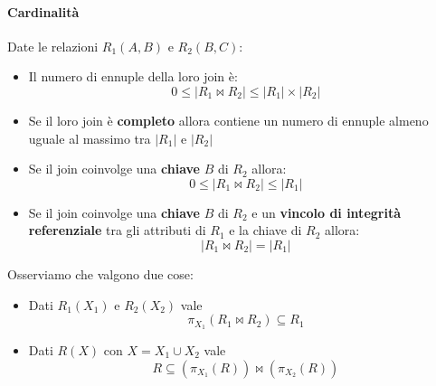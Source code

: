 \paragraph{Cardinalità} Date le relazioni $R_1(A,B)$ e $R_2(B, C)$:
\begin{itemize}
	\item Il numero di ennuple della loro join è:
	\begin{equation*}
		0 \leq \lvert R_1 \Join R_2 \rvert \leq \lvert R_1 \rvert \times \lvert R_2 \rvert
	\end{equation*}
	\item Se il loro join è \textbf{completo} allora contiene un numero di ennuple almeno uguale al massimo tra $\lvert R_1 \rvert$ e $\lvert R_2 \rvert$
	\item Se il join coinvolge una \textbf{chiave} $B$ di $R_2$ allora:
	\begin{equation*}
		0 \leq \lvert R_1 \Join R_2 \rvert \leq \lvert R_1 \rvert 
	\end{equation*}
	\item Se il join coinvolge una \textbf{chiave} $B$ di $R_2$ e un \textbf{vincolo di integrità referenziale} tra gli attributi di $R_1$ e la chiave di $R_2$ allora:
	\begin{equation*}
		\lvert R_1 \Join R_2 \rvert = \lvert R_1 \rvert
	\end{equation*}
\end{itemize}

\begin{observation}
	Osserviamo che valgono due cose:
	\begin{itemize}
		\item Dati $R_1(X_1)$ e $R_2(X_2)$ vale
		\begin{equation}
			\pi_{X_1}(R_1 \Join R_2) \subseteq R_1
		\end{equation}
		\item Dati $R(X)$ con $X = X_1 \cup X_2$ vale
		\begin{equation}
			R \subseteq (\pi_{X_1}(R)) \Join (\pi_{X_2}(R))
		\end{equation}
	\end{itemize}
\end{observation}

\newpage
